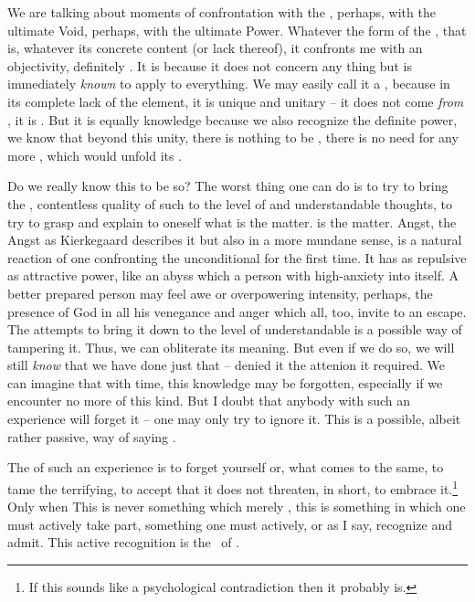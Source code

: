 {We are talking about moments of confrontation with the , perhaps, with the ultimate Void, perhaps, with the
ultimate Power.  Whatever the form of the , that
is, whatever its concrete content (or lack thereof), it confronts me
with an  objectivity, definitely .  It is
 because it does not concern any thing but is immediately
{\em known} to apply to everything.  We may easily call it a
, because in its complete lack of the 
element, it is unique and unitary -- it does not come {\em from}
, it is .  But it is equally knowledge because we also
recognize the definite  power, we know that beyond this
unity, there is nothing to be , there is no need for
any more , which would unfold its
.

\subpa Do we really know this to be so?  The worst thing one can do is
to try to bring the , contentless quality of such
 to the level of  and understandable
thoughts, to try to grasp and explain to oneself what is the matter. 
 is the matter. 
Angst, the Angst as Kierkegaard describes it but also in a more 
mundane sense, is a natural reaction of
one confronting the unconditional for the first time.  It has as 
repulsive as attractive power, like an abyss which  a 
person with high-anxiety into itself. 
A better
prepared person may feel awe or overpowering intensity, perhaps, the
presence of God in all his venegance and anger which all, too, invite
to an escape.  The attempts to bring it down to the level of
 understandable is a possible way of tampering it.  Thus,
we can obliterate its meaning.  But even if we do so, we will still
{\em know} that we have done just that -- denied it the attenion it
required.  We can imagine that with time, this knowledge may be
forgotten, especially if we encounter no more  of this
kind.  But I doubt that anybody with such an experience will forget it
-- one may only try to ignore it.  This is a possible, albeit rather
passive, way of saying \No.

\pa The  of such an experience is to forget yourself or, 
what comes to the same, to tame the terrifying, to accept that it does 
not threaten, in short, to embrace it.\footnote{If this sounds like a 
psychological contradiction then it probably is. }
Only when  This is never something which
merely , this is something in which one must
actively take part, something one must actively, or as I say,
 recognize and admit.  This active recognition is the
\sch\ of \yes.


}
